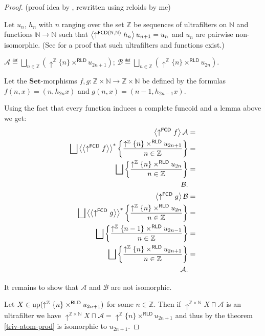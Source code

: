 \begin{proof}
(proof idea by , rewritten using reloids by me)

Let $u_{n}$, $h_{n}$ with $n$ ranging over the set $\mathbb{Z}$
be sequences of ultrafilters on $\mathbb{N}$ and functions $\mathbb{N}\rightarrow\mathbb{N}$
such that $\left\langle \uparrow^{\mathsf{FCD}(\mathbb{N},\mathbb{N})}h_{n}\right\rangle u_{n+1}=u_{n}$
and $u_{n}$ are pairwise non-isomorphic. (See \cite{kleene-degrees}
for a proof that such ultrafilters and functions exist.)

$\mathcal{A}\eqdef\bigsqcup_{n\in\mathbb{Z}}(\uparrow^{\mathbb{Z}}\{n\}\times^{\mathsf{RLD}} u_{2n+1})$;
$\mathcal{B}\eqdef\bigsqcup_{n\in\mathbb{Z}}(\uparrow^{\mathbb{Z}}\{n\}\times^{\mathsf{RLD}} u_{2n})$.

Let the $\mathbf{Set}$-morphisms $f,g:\mathbb{Z}\times\mathbb{N}\rightarrow\mathbb{Z}\times\mathbb{N}$
be defined by the formulas $f(n,x)=(n,h_{2n}x)$ and $g(n,x)=(n-1,h_{2n-1}x)$.

Using the fact that every function induces a complete funcoid and
a lemma above we get:
\begin{align*}
\supfun{\uparrow^{\mathsf{FCD}}f}\mathcal{A} & =\\
\bigsqcup\rsupfun{\supfun{\uparrow^{\mathsf{FCD}}f}}\setcond{\uparrow^{\mathbb{Z}}\{n\}\times^{\mathsf{RLD}} u_{2n+1}}{n\in\mathbb{Z}} & =\\
\bigsqcup\setcond{\uparrow^{\mathbb{Z}}\{n\}\times^{\mathsf{RLD}} u_{2n}}{n\in\mathbb{Z}} & =\\
\mathcal{B}.\\
\supfun{\uparrow^{\mathsf{FCD}}g}\mathcal{B} & =\\
\bigsqcup\rsupfun{\supfun{\uparrow^{\mathsf{FCD}}g}}\setcond{\uparrow^{\mathbb{Z}}\{n\}\times^{\mathsf{RLD}} u_{2n}}{n\in\mathbb{Z}} & =\\
\bigsqcup\setcond{\uparrow^{\mathbb{Z}}\{n-1\}\times^{\mathsf{RLD}} u_{2n-1}}{n\in\mathbb{Z}} & =\\
\bigsqcup\setcond{\uparrow^{\mathbb{Z}}\{n\}\times^{\mathsf{RLD}} u_{2n+1}}{n\in\mathbb{Z}} & =\\
\mathcal{A}.
\end{align*}


It remains to show that $\mathcal{A}$ and $\mathcal{B}$ are not
isomorphic.

Let $X\in\operatorname{up}(\uparrow^{\mathbb{Z}}\{n\}\times^{\mathsf{RLD}}u_{2n+1})$
for some $n\in\mathbb{Z}$. Then if $\uparrow^{\mathbb{Z}\times\mathbb{N}}X\sqcap\mathcal{A}$
is an ultrafilter we have $\uparrow^{\mathbb{Z}\times\mathbb{N}}X\sqcap\mathcal{A}=\uparrow^{\mathbb{Z}}\{n\}\times^{\mathsf{RLD}}u_{2n+1}$
and thus by the theorem \ref{triv-atom-prod} is isomorphic to $u_{2n+1}$.


\end{proof}
